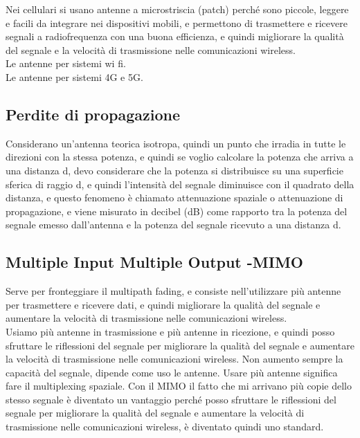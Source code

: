 Nei cellulari si usano antenne a microstriscia (patch) perché sono piccole, leggere e facili da integrare nei dispositivi mobili, e permettono di trasmettere e ricevere segnali a radiofrequenza con una buona efficienza, e quindi migliorare la qualità del segnale e la velocità di trasmissione nelle comunicazioni wireless.\\

Le antenne per sistemi wi fi.\\

Le antenne per sistemi 4G e 5G.\\

\subsection{Perdite di propagazione}

Considerano un'antenna teorica isotropa, quindi un punto che irradia in tutte le direzioni con la stessa potenza, e quindi se voglio calcolare la potenza che arriva a una distanza d, devo considerare che la potenza si distribuisce su una superficie sferica di raggio d, e quindi l'intensità del segnale diminuisce con il quadrato della distanza, e questo fenomeno è chiamato attenuazione spaziale o attenuazione di propagazione, e viene misurato in decibel (dB) come rapporto tra la potenza del segnale emesso dall'antenna e la potenza del segnale ricevuto a una distanza d.\\
\subsection{Multiple Input Multiple Output -MIMO}
Serve per fronteggiare il multipath fading, e consiste nell'utilizzare più antenne per trasmettere e ricevere dati, e quindi migliorare la qualità del segnale e aumentare la velocità di trasmissione nelle comunicazioni wireless.\\

Usiamo più antenne in trasmissione e più antenne in ricezione, e quindi posso sfruttare le riflessioni del segnale per migliorare la qualità del segnale e aumentare la velocità di trasmissione nelle comunicazioni wireless. Non aumento sempre la capacità del segnale, dipende come uso le antenne. Usare più antenne significa fare il multiplexing spaziale. Con il MIMO il fatto che mi arrivano più copie dello stesso segnale è diventato un vantaggio perché posso sfruttare le riflessioni del segnale per migliorare la qualità del segnale e aumentare la velocità di trasmissione nelle comunicazioni wireless, è diventato quindi uno standard.\\

